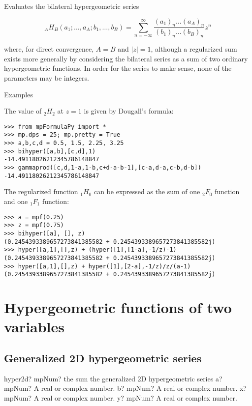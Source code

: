 \vpara
Evaluates the bilateral hypergeometric series

\begin{equation}
{}_AH_B(a_1;\ldots,a_A;b_1,\ldots,b_B) = \sum_{n=-\infty}^{\infty} \frac{(a_1)_n \ldots (a_A)_n}{(b_1)_n \ldots (b_B)_n} z^n
\end{equation}

where, for direct convergence, $A=B$ and $|z|=1$, although a regularized sum exists
more generally by considering the bilateral series as a sum of two ordinary hypergeometric functions. In order for the series to make sense, none of the parameters may be integers.

Examples

The value of ${}_2H_2$ at $z=1$ is given by Dougall's formula:

\begin{lstlisting}
>>> from mpFormulaPy import *
>>> mp.dps = 25; mp.pretty = True
>>> a,b,c,d = 0.5, 1.5, 2.25, 3.25
>>> bihyper([a,b],[c,d],1)
-14.49118026212345786148847
>>> gammaprod([c,d,1-a,1-b,c+d-a-b-1],[c-a,d-a,c-b,d-b])
-14.49118026212345786148847
\end{lstlisting}

The regularized function ${}_1H_0$ can be expressed as the sum of one ${}_2F_0$ function and one ${}_1F_1$ function:


\begin{lstlisting}
>>> a = mpf(0.25)
>>> z = mpf(0.75)
>>> bihyper([a], [], z)
(0.2454393389657273841385582 + 0.2454393389657273841385582j)
>>> hyper([a,1],[],z) + (hyper([1],[1-a],-1/z)-1)
(0.2454393389657273841385582 + 0.2454393389657273841385582j)
>>> hyper([a,1],[],z) + hyper([1],[2-a],-1/z)/z/(a-1)
(0.2454393389657273841385582 + 0.2454393389657273841385582j)
\end{lstlisting}



\newpage
\section{Hypergeometric functions of two variables}

\subsection{Generalized 2D hypergeometric series}

\begin{mpFunctionsExtract}
	\mpFunctionFour
	{hyper2d? mpNum? the sum the generalized 2D hypergeometric series}
	{a? mpNum? A real or complex number.}
	{b? mpNum? A real or complex number.}	
	{x? mpNum? A real or complex number.}		
	{y? mpNum? A real or complex number.}		
\end{mpFunctionsExtract}

